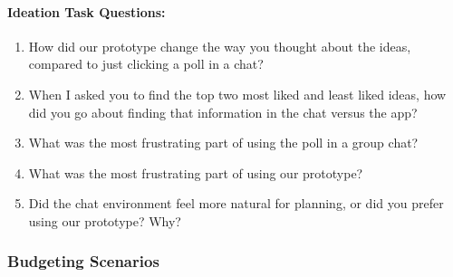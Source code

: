 \documentclass[12pt,a4paper]{article}
\begin{document}
\paragraph{Ideation Task Questions: }
\begin{enumerate}
    \item How did our prototype change the way you thought about the ideas, compared to just clicking a poll in a chat? 
    \item When I asked you to find the top two most liked and least liked ideas, how did you go about finding that information in the chat versus the app?
    \item What was the most frustrating part of using the poll in a group chat?
    \item What was the most frustrating part of using our prototype?
    \item Did the chat environment feel more natural for planning, or did you prefer using our prototype? Why?
\end{enumerate}


\newpage

\subsubsection{Budgeting Scenarios}
\end{document}
